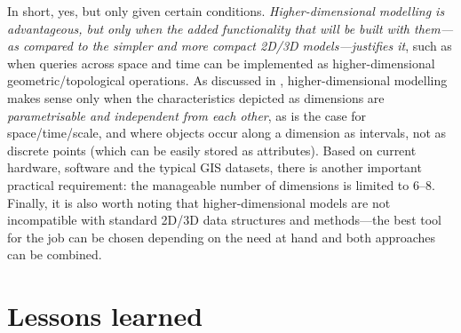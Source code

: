 In short, yes, but only given certain conditions.
\emph{Higher-dimensional modelling is advantageous, but only when the added functionality that will be built with them---as compared to the simpler and more compact 2D/3D models---justifies it}, such as when queries across space and time can be implemented as higher-dimensional geometric/topological operations.
As discussed in , higher-dimensional modelling makes sense only when the characteristics depicted as dimensions are \emph{parametrisable and independent from each other}, as is the case for space/time/scale, and where objects occur along a dimension as intervals, not as discrete points (which can be easily stored as attributes).
Based on current hardware, software and the typical GIS datasets, there is another important practical requirement: the manageable number of dimensions is limited to 6--8.
Finally, it is also worth noting that higher-dimensional models are not incompatible with standard 2D/3D data structures and methods---the best tool for the job can be chosen depending on the need at hand and both approaches can be combined.

\section{Lessons learned}
\label{se:conclusions}

